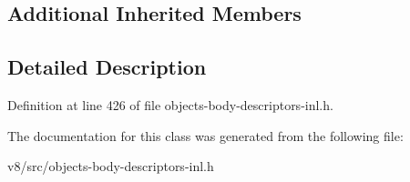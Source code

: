 \subsection*{Additional Inherited Members}


\subsection{Detailed Description}


Definition at line 426 of file objects-\/body-\/descriptors-\/inl.\+h.



The documentation for this class was generated from the following file\+:\begin{DoxyCompactItemize}
\item 
v8/src/objects-\/body-\/descriptors-\/inl.\+h\end{DoxyCompactItemize}
